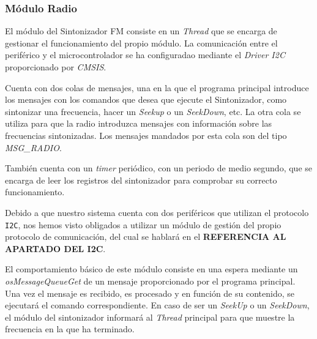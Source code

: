 \subsubsection{Módulo Radio}
El módulo del Sintonizador FM consiste en un \textit{Thread} que se encarga de gestionar el funcionamiento del propio módulo. La comunicación entre el periférico y el microcontrolador se ha configuradao mediante el \textit{Driver I2C} proporcionado por \textit{CMSIS}.

Cuenta con dos colas de mensajes, una en la que el programa principal introduce los mensajes con los comandos que desea que ejecute el Sintonizador, como sintonizar una frecuencia, hacer un \textit{Seekup} o un \textit{SeekDown}, etc. La otra cola se utiliza para que la radio introduzca mensajes con información sobre las frecuencias sintonizadas. Los mensajes mandados por esta cola son del tipo \textit{MSG\_RADIO}.

También cuenta con un \textit{timer} periódico, con un periodo de medio segundo, que se encarga de leer los registros del sintonizador para comprobar su correcto funcionamiento.

Debido a que nuestro sistema cuenta con dos periféricos que utilizan el protocolo \texttt{I2C}, nos hemos visto obligados a utilizar un módulo de gestión del propio protocolo de comunicación, del cual se hablará en el \textbf{REFERENCIA AL APARTADO DEL I2C}.

El comportamiento básico de este módulo consiste en una espera mediante un \textit{osMessageQueueGet} de un mensaje proporcionado por el programa principal. Una vez el mensaje es recibido, es procesado y en función de su contenido, se ejecutará el comando correspondiente. En caso de ser un \textit{SeekUp} o un \textit{SeekDown}, el módulo del sintonizador informará al \textit{Thread} principal para que muestre la frecuencia en la que ha terminado.